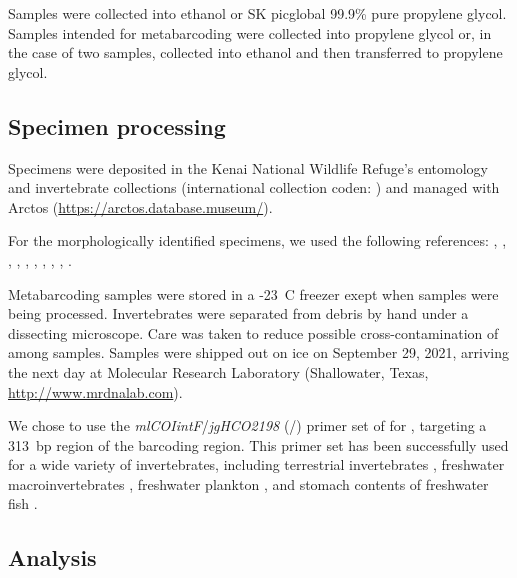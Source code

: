 \begin{multicols}{2}


Samples were collected into ethanol or SK picglobal 99.9\% pure propylene glycol. Samples intended for metabarcoding were collected into propylene glycol or, in the case of two samples, collected into ethanol and then transferred to propylene glycol.

\subsection{Specimen processing}

Specimens were deposited in the Kenai National Wildlife Refuge's entomology and invertebrate collections (international collection coden: ) and managed with Arctos (\url{https://arctos.database.museum/}).



For the morphologically identified specimens, we used the following references: \cite{Borroretal1989}, \cite{Collet2008}, \cite{Durfee2005}, \cite{Hatch1953}, \cite{Kenner2009}, \cite{MerrittCummins1996}, \cite{Merrittetal2008}, \cite{Reid1987}, \cite{Roughley2000}, \cite{Wallis1933}.

Metabarcoding samples were stored in a -23~\textdegree{}C freezer exept when samples were being processed. Invertebrates were separated from debris by hand under a dissecting microscope. Care was taken to reduce possible cross-contamination of  among samples. Samples were shipped out on ice on September 29, 2021, arriving the next day at Molecular Research Laboratory (Shallowater, Texas, \url{http://www.mrdnalab.com}).

We chose to use the \textit{mlCOIintF}/\textit{jgHCO2198} (\-/\-) primer set of \citet{Lerayetal2013} for , targeting a 313~bp region of the   barcoding region. This primer set has been successfully used for a wide variety of invertebrates, including terrestrial invertebrates \citep{Bowseretal2020}, freshwater macroinvertebrates \citep{Hajibabaeietal2019}, freshwater plankton \citep{Yangetal2017}, and stomach contents of freshwater fish \citep{BowserBowser2020}.

\subsection{Analysis}


\end{multicols}
